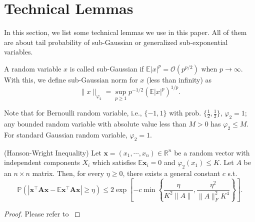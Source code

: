 \section{Technical Lemmas}
In this section, we list some technical lemmas we use in this paper. All of them are about tail probability of sub-Gaussian or generalized sub-exponential variables. 

\begin{definition}
	\label{def:sub-gaussian}
	A random variable $x$ is called sub-Gaussian if $\mathbb{E} |x|^p = \mathcal{O}(p^{p/2})$ when $p\rightarrow \infty$. With this, we define sub-Gaussian norm for $x$ (less than infinity) as 
	\begin{equation}
	\|x\|_{\varphi_2} = \sup_{p\ge 1} p^{-1/2} (\mathbb{E} |x|^p)^{1/p}. 
	\end{equation}
\end{definition}

Note that for Bernoulli random variable, i.e., $\{-1,1\}$ with prob. $\{\frac{1}{2},\frac{1}{2} \}$,  $\varphi_2=1$; any bounded random variable with absolute value less than $M>0$ has $\varphi_2\le M$.  For standard Gaussian random variable, $\varphi_2=1$. 



\begin{lem}
\label{lemma:hanson_wright}
(Hanson-Wright Inequality) Let $\mathbf{x} = (x_1,\cdots , x_n)\in \mathbb{R}^n$ be a random
vector with independent components $X_i$ which satisfies $\mathbb{E} \mathbf{x}_i = 0$ and $\varphi_2(x_1)\le K$. Let $A$
be an $n\times n$ matrix. Then, for every $\eta \ge 0$, there exists a general constant $c$ s.t.
\begin{equation}
\mathbb{P}\left(|\mathbf{x^\top A x} - \mathbb{E}\mathbf{x^\top A x}|\ge \eta\right)\le 2\exp\left[-c\min\left\{\frac{\eta}{K^2\|A\|}, \frac{\eta^2}{\|A\|_F^2 K^4}\right\}\right]. \nonumber
\end{equation}
\end{lem}

\begin{proof}
	Please refer to \cite{rudelson2013hanson}
\end{proof}



